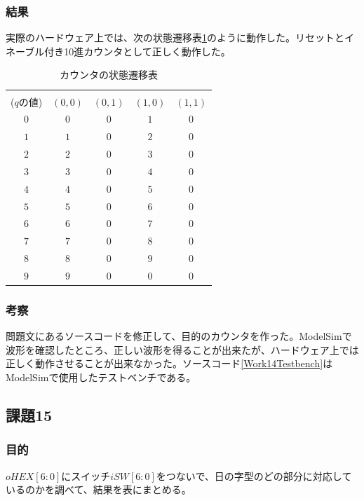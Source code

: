 \documentclass[a4paper]{jarticle}
\begin{document}
\subsubsection{結果}
実際のハードウェア上では、次の状態遷移表\ref{Work14StateTransitionTable}のように動作した。リセットとイネーブル付き10進カウンタとして正しく動作した。
\begin{table}[!h]
	\begin{center}
		\caption{カウンタの状態遷移表}
		\label{Work14StateTransitionTable}
		\begin{tabular}{|c||c|c|c|c|}
			\hline
			\backslashbox{現状態\\($q$の値)}{$\left(en,clr\right)$}	&$\left(0,0\right)$	&$\left(0,1\right)$	&$\left(1,0\right)$	&$\left(1,1\right)$\\	\hline
			$0$							&$0$			&$0$			&$1$			&$0$\\			\hline
			$1$							&$1$			&$0$			&$2$			&$0$\\			\hline
			$2$							&$2$			&$0$			&$3$			&$0$\\			\hline
			$3$							&$3$			&$0$			&$4$			&$0$\\			\hline
			$4$							&$4$			&$0$			&$5$			&$0$\\			\hline
			$5$							&$5$			&$0$			&$6$			&$0$\\			\hline
			$6$							&$6$			&$0$			&$7$			&$0$\\			\hline
			$7$							&$7$			&$0$			&$8$			&$0$\\			\hline
			$8$							&$8$			&$0$			&$9$			&$0$\\			\hline
			$9$							&$9$			&$0$			&$0$			&$0$\\			\hline
		\end{tabular}
	\end{center}
\end{table}
\subsubsection{考察}
問題文にあるソースコードを修正して、目的のカウンタを作った。ModelSimで波形を確認したところ、正しい波形を得ることが出来たが、ハードウェア上では正しく動作させることが出来なかった。ソースコード\ref{Work14Testbench}はModelSimで使用したテストベンチである。

\subsection{課題15}
\subsubsection{目的}
$oHEX[6:0]$にスイッチ$iSW[6:0]$をつないで、日の字型のどの部分に対応しているのかを調べて、結果を表にまとめる。
\end{document}
